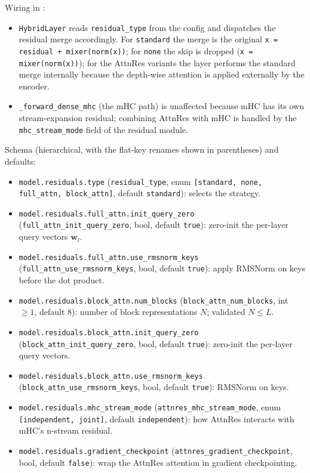 Wiring in :
\begin{itemize}[leftmargin=*]
    \item \texttt{HybridLayer} reads \texttt{residual\_type} from the
        config and dispatches the residual merge accordingly. For
        \texttt{standard} the merge is the original
        \texttt{x = residual + mixer(norm(x))}; for \texttt{none} the
        skip is dropped (\texttt{x = mixer(norm(x))}); for the AttnRes
        variants the layer performs the standard merge internally
        because the depth-wise attention is applied externally by the
        encoder.
    \item \texttt{\_forward\_dense\_mhc} (the mHC path) is unaffected
        because mHC has its own stream-expansion residual; combining
        AttnRes with mHC is handled by the \texttt{mhc\_stream\_mode}
        field of the residual module.
\end{itemize}

Schema (hierarchical, with the flat-key renames shown in parentheses)
and defaults:
\begin{itemize}[leftmargin=*]
    \item \texttt{model.residuals.type} (\texttt{residual\_type},
        enum \texttt{[standard, none, full\_attn, block\_attn]},
        default \texttt{standard}): selects the strategy.
    \item \texttt{model.residuals.full\_attn.init\_query\_zero}
        (\texttt{full\_attn\_init\_query\_zero}, bool, default
        \texttt{true}): zero-init the per-layer query vectors
        $\mathbf{w}_l$.
    \item \texttt{model.residuals.full\_attn.use\_rmsnorm\_keys}
        (\texttt{full\_attn\_use\_rmsnorm\_keys}, bool, default
        \texttt{true}): apply RMSNorm on keys before the dot product.
    \item \texttt{model.residuals.block\_attn.num\_blocks}
        (\texttt{block\_attn\_num\_blocks}, int $\ge 1$, default
        $8$): number of block representations $N$; validated
        $N \le L$.
    \item \texttt{model.residuals.block\_attn.init\_query\_zero}
        (\texttt{block\_attn\_init\_query\_zero}, bool, default
        \texttt{true}): zero-init the per-layer query vectors.
    \item \texttt{model.residuals.block\_attn.use\_rmsnorm\_keys}
        (\texttt{block\_attn\_use\_rmsnorm\_keys}, bool, default
        \texttt{true}): RMSNorm on keys.
    \item \texttt{model.residuals.mhc\_stream\_mode}
        (\texttt{attnres\_mhc\_stream\_mode}, enum
        \texttt{[independent, joint]}, default \texttt{independent}):
        how AttnRes interacts with mHC's n-stream residual.
    \item \texttt{model.residuals.gradient\_checkpoint}
        (\texttt{attnres\_gradient\_checkpoint}, bool, default
        \texttt{false}): wrap the AttnRes attention in gradient
        checkpointing.
\end{itemize}

